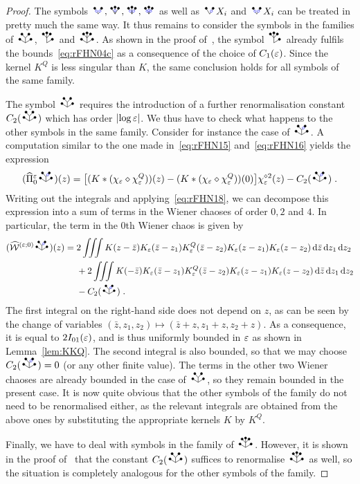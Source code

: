 \documentclass[reqno,11pt]{article}
\def\KQ{K^Q}
\def\chiQ{\chi^Q}
\begin{document}
\begin{proof}
The symbols $\RSVoo, \RSWo, \RSWoo, \RSWooo$ as well as $\RSVo X_i$ and $\RSVoo
X_i$ can be treated in pretty much the same way. It thus remains to consider
the symbols in the families of $\RSWV$, $\RSVW$ and $\RSWW$. As shown in the
proof of~\cite[Thm.~10.22]{Hairer2014}, the symbol $\RSVW$ already fulfils the
bounds~\eqref{eq:rFHN04c} as a consequence of the choice of $C_1(\varepsilon)$. Since
the kernel $\KQ$ is less singular than $K$, the same conclusion holds for all
symbols of the same family. 

The symbol $\RSWV$ requires the introduction of a further renormalisation
constant $C_2(\RSWV)$ which has order $\lvert\log\varepsilon\rvert$. We thus have to check
what happens to the other symbols in the same family. Consider for instance the
case of $\RSWVo$. A computation similar to the one made in~\eqref{eq:rFHN15}
and~\eqref{eq:rFHN16} yields the expression 
\[
  (\widehat\Pi_0^\eps \RSWVo)(z)
 = \bigbrak{(K*(\chi_\eps\diamond\chiQ_\eps))(z) -
(K*(\chi_\eps\diamond\chiQ_\eps))(0)}
 \chi_\eps^{\diamond 2}(z) - C_2(\RSWVo)\;.
\]
Writing out the integrals and applying~\eqref{eq:rFHN18}, we can decompose this
expression into a sum of terms in the Wiener chaoses of order $0, 2$ and $4$.
In particular, the term in the $0$th Wiener chaos is given by 
\begin{align*}
(\widehat \cW^{(\eps;0)}\RSWVo)(z) 
{}={} & 2\iiint K(z-\bar z)K_\eps(\bar z-z_1)\KQ_\eps(\bar z-z_2)
K_\eps(z-z_1)K_\eps(z-z_2)\6\bar z\6z_1\6z_2 \\
& {}+ 2\iiint K(-\bar z)K_\eps(\bar z-z_1)\KQ_\eps(\bar z-z_2)
K_\eps(z-z_1)K_\eps(z-z_2)\6\bar z\6z_1\6z_2\\
& {}- C_2(\RSWVo)\;.
\end{align*}
The first integral on the right-hand side does not depend on $z$, as can be seen
by the change of variables $(\bar z,z_1,z_2)\mapsto(\bar z+z,z_1+z,z_2+z)$. As a
consequence, it is equal to $2I_{01}(\varepsilon)$, and is thus uniformly bounded in
$\varepsilon$ as shown in Lemma~\ref{lem:KKQ}. The second integral is also bounded, so
that we may choose $C_2(\RSWVo) = 0$ (or any other finite value). The terms in
the other two Wiener chaoses are already bounded in the case of $\RSWV$, so
they remain bounded in the present case. It is now quite obvious that the other
symbols of the family do not need to be renormalised either, as the relevant
integrals are obtained from the above ones by substituting the appropriate
kernels $K$ by $\KQ$. 

Finally, we have to deal with symbols in the family of $\RSWW$. However, it is
shown in the proof of~\cite[Thm.~10.22]{Hairer2014} that the constant
$C_2(\RSWV)$ suffices to renormalise $\RSWW$ as well, so the situation is
completely analogous for the other symbols of the family.  
\end{proof}
\end{document}
